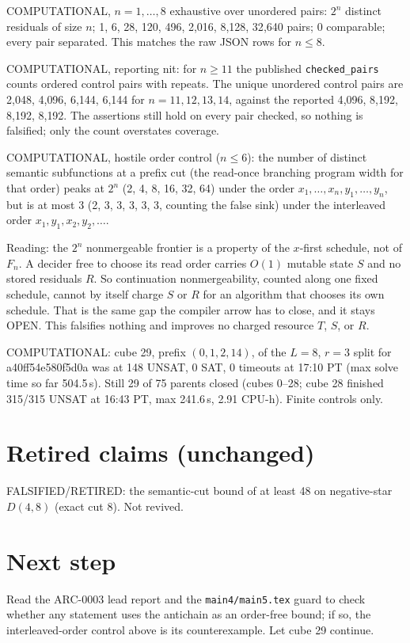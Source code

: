 \documentclass[11pt]{article}
\begin{document}
COMPUTATIONAL, $n=1,\dots,8$ exhaustive over unordered pairs: $2^n$ distinct residuals of size $n$; 1, 6, 28, 120, 496, 2{,}016, 8{,}128, 32{,}640 pairs; 0 comparable; every pair separated. This matches the raw JSON rows for $n\le 8$.

COMPUTATIONAL, reporting nit: for $n\ge 11$ the published \texttt{checked\_pairs} counts ordered control pairs with repeats. The unique unordered control pairs are 2{,}048, 4{,}096, 6{,}144, 6{,}144 for $n=11,12,13,14$, against the reported 4{,}096, 8{,}192, 8{,}192, 8{,}192. The assertions still hold on every pair checked, so nothing is falsified; only the count overstates coverage.

COMPUTATIONAL, hostile order control ($n\le 6$): the number of distinct semantic subfunctions at a prefix cut (the read-once branching program width for that order) peaks at $2^n$ (2, 4, 8, 16, 32, 64) under the order $x_1,\dots,x_n,y_1,\dots,y_n$, but is at most 3 (2, 3, 3, 3, 3, 3, counting the false sink) under the interleaved order $x_1,y_1,x_2,y_2,\dots$.

Reading: the $2^n$ nonmergeable frontier is a property of the $x$-first schedule, not of $F_n$. A decider free to choose its read order carries $O(1)$ mutable state $S$ and no stored residuals $R$. So continuation nonmergeability, counted along one fixed schedule, cannot by itself charge $S$ or $R$ for an algorithm that chooses its own schedule. That is the same gap the compiler arrow has to close, and it stays OPEN. This falsifies nothing and improves no charged resource $T$, $S$, or $R$.

COMPUTATIONAL: cube 29, prefix $(0,1,2,14)$, of the $L=8$, $r=3$ split for a40ff54e580f5d0a was at 148 UNSAT, 0 SAT, 0 timeouts at 17:10 PT (max solve time so far 504.5\,s). Still 29 of 75 parents closed (cubes 0--28; cube 28 finished 315/315 UNSAT at 16:43 PT, max 241.6\,s, 2.91 CPU-h). Finite controls only.

\section*{Retired claims (unchanged)}
FALSIFIED/RETIRED: the semantic-cut bound of at least 48 on negative-star $D(4,8)$ (exact cut 8). Not revived.

\section*{Next step}
Read the ARC-0003 lead report and the \texttt{main4/main5.tex} guard to check whether any statement uses the antichain as an order-free bound; if so, the interleaved-order control above is its counterexample. Let cube 29 continue.
\end{document}
